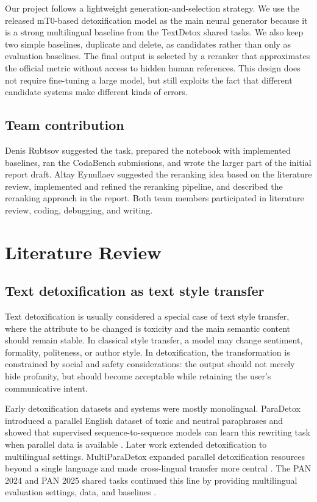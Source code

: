 \documentclass{article}
\begin{document}
Our project follows a lightweight generation-and-selection strategy. We use the released mT0-based detoxification model as the main neural generator because it is a strong multilingual baseline from the TextDetox shared tasks. We also keep two simple baselines, duplicate and delete, as candidates rather than only as evaluation baselines. The final output is selected by a reranker that approximates the official metric without access to hidden human references. This design does not require fine-tuning a large model, but still exploits the fact that different candidate systems make different kinds of errors.

\subsection{Team contribution}
Denis Rubtsov suggested the task, prepared the notebook with implemented baselines, ran the CodaBench submissions, and wrote the larger part of the initial report draft. Altay Eynullaev suggested the reranking idea based on the literature review, implemented and refined the reranking pipeline, and described the reranking approach in the report. Both team members participated in literature review, coding, debugging, and writing.

\section{Literature Review}
\label{sec:literature}

\subsection{Text detoxification as text style transfer}

Text detoxification is usually considered a special case of text style transfer, where the attribute to be changed is toxicity and the main semantic content should remain stable. In classical style transfer, a model may change sentiment, formality, politeness, or author style. In detoxification, the transformation is constrained by social and safety considerations: the output should not merely hide profanity, but should become acceptable while retaining the user's communicative intent.

Early detoxification datasets and systems were mostly monolingual. ParaDetox introduced a parallel English dataset of toxic and neutral paraphrases and showed that supervised sequence-to-sequence models can learn this rewriting task when parallel data is available \cite{logacheva2022paradetox}. Later work extended detoxification to multilingual settings. MultiParaDetox expanded parallel detoxification resources beyond a single language and made cross-lingual transfer more central \cite{dementieva2024multiparadetox}. The PAN 2024 and PAN 2025 shared tasks continued this line by providing multilingual evaluation settings, data, and baselines \cite{dementieva2024pantextdetox,dementieva2025pantextdetox}.
\end{document}
